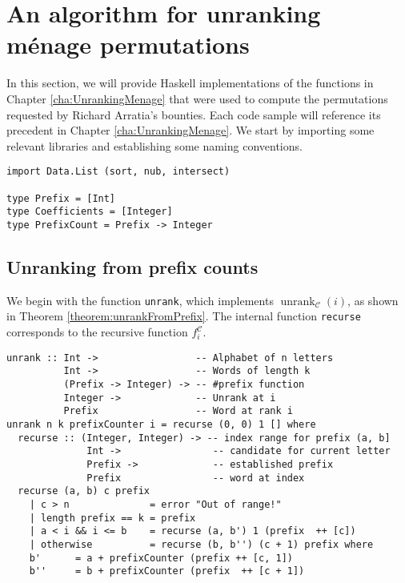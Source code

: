 \section{An algorithm for unranking m\'enage permutations}
\label{apndx:haskell}
In this section, we will provide Haskell implementations of the functions in
Chapter \ref{cha:UnrankingMenage} that were used to compute the permutations
requested by Richard Arratia's bounties.
Each code sample will reference its
precedent in Chapter \ref{cha:UnrankingMenage}. We start by importing some
relevant libraries
and establishing some naming conventions.

\begin{singlespace}\begin{verbatim}
import Data.List (sort, nub, intersect)

type Prefix = [Int]
type Coefficients = [Integer]
type PrefixCount = Prefix -> Integer
\end{verbatim}\end{singlespace}

\subsection{Unranking from prefix counts}

We begin with the function \texttt{unrank}, which implements
$\operatorname{unrank}_\mathcal{C}(i)$, as shown in
Theorem \ref{theorem:unrankFromPrefix}. The internal function
\texttt{recurse} corresponds to the recursive function $f_i^\mathcal{C}$.
\begin{singlespace}\begin{verbatim}
unrank :: Int ->                 -- Alphabet of n letters
          Int ->                 -- Words of length k
          (Prefix -> Integer) -> -- #prefix function
          Integer ->             -- Unrank at i
          Prefix                 -- Word at rank i
unrank n k prefixCounter i = recurse (0, 0) 1 [] where
  recurse :: (Integer, Integer) -> -- index range for prefix (a, b]
              Int ->                -- candidate for current letter
              Prefix ->             -- established prefix
              Prefix                -- word at index
  recurse (a, b) c prefix
    | c > n              = error "Out of range!"
    | length prefix == k = prefix
    | a < i && i <= b    = recurse (a, b') 1 (prefix  ++ [c])
    | otherwise          = recurse (b, b'') (c + 1) prefix where
    b'      = a + prefixCounter (prefix ++ [c, 1])
    b''     = b + prefixCounter (prefix  ++ [c + 1])
\end{verbatim}\end{singlespace}

